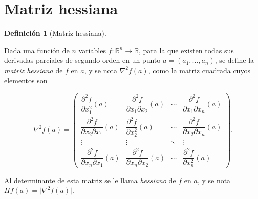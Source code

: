 \documentclass[
  a4paper,
]{scrreport}
\theoremstyle{definition}
\newtheorem{definition}{Definición}[chapter]
\theoremstyle{plain}
\theoremstyle{plain}
\theoremstyle{definition}
\theoremstyle{definition}
\theoremstyle{plain}
\theoremstyle{remark}
\begin{document}
\hypertarget{matriz-hessiana}{%
\section{Matriz hessiana}\label{matriz-hessiana}}

\begin{definition}[Matriz
hessiana]\protect\hypertarget{def-matriz-hessiana}{}\label{def-matriz-hessiana}

Dada una función de \(n\) variables
\(f:\mathbb{R}^n\rightarrow \mathbb{R}\), para la que existen todas sus
derivadas parciales de segundo orden en un punto \(a=(a_1,\ldots,a_n)\),
se define la \emph{matriz hessiana} de \(f\) en \(a\), y se nota
\(\nabla^2f(a)\), como la matriz cuadrada cuyos elementos son

\[\nabla^2f(a)=\left(
\begin{array}{cccc}
\dfrac{\partial^2 f}{\partial x_1^2}(a) &
\dfrac{\partial^2 f}{\partial x_1 \partial x_2}(a) &
\cdots &
\dfrac{\partial^2 f}{\partial x_1 \partial x_n}(a)\\
\dfrac{\partial^2 f}{\partial x_2 \partial x_1}(a) &
\dfrac{\partial^2 f}{\partial x_2^2}(a) &
\cdots &
\dfrac{\partial^2 f}{\partial x_2 \partial x_n}(a)\\
\vdots & \vdots & \ddots & \vdots \\
\dfrac{\partial^2 f}{\partial x_n \partial x_1}(a) &
\dfrac{\partial^2 f}{\partial x_n \partial x_2}(a) &
\cdots &
\dfrac{\partial^2 f}{\partial x_n^2}(a)
\end{array}
\right).\]

Al determinante de esta matriz se le llama \emph{hessiano} de \(f\) en
\(a\), y se nota \(Hf(a)=\lvert \nabla^2f(a)\rvert\).

\end{definition}
\end{document}
